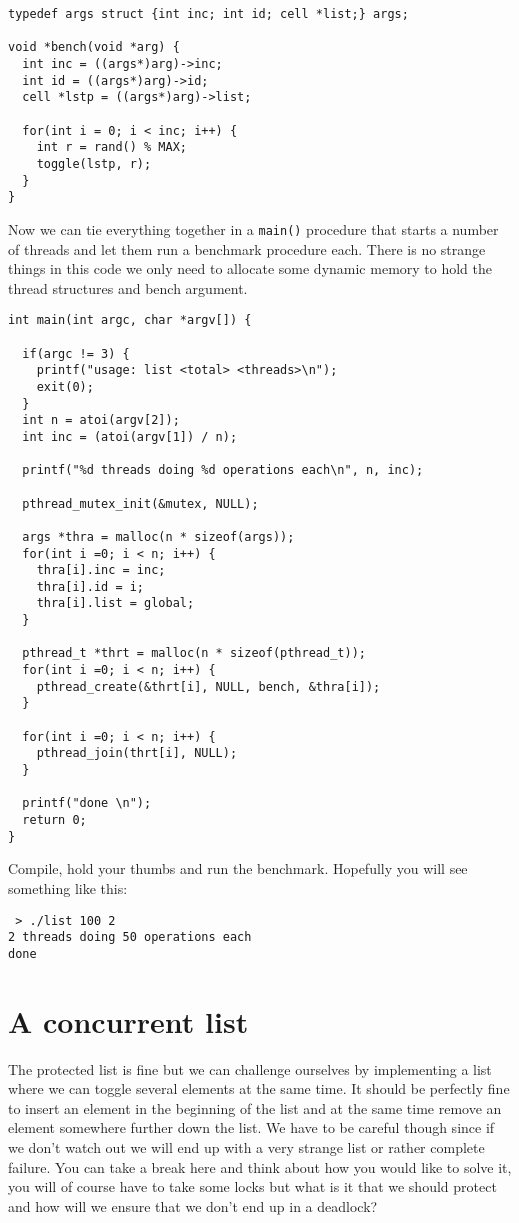 \documentclass[a4paper,11pt]{article}
\begin{document}
\begin{lstlisting}
typedef args struct {int inc; int id; cell *list;} args;

void *bench(void *arg) {
  int inc = ((args*)arg)->inc;
  int id = ((args*)arg)->id;
  cell *lstp = ((args*)arg)->list;  

  for(int i = 0; i < inc; i++) {
    int r = rand() % MAX;
    toggle(lstp, r);
  }
}
\end{lstlisting}

Now we can tie everything together in a {\tt main()} procedure that
starts a number of threads and let them run a benchmark procedure
each. There is no strange things in this code we only need to allocate
some dynamic memory to hold the thread structures and bench argument.

\begin{lstlisting}
int main(int argc, char *argv[]) {

  if(argc != 3) {
    printf("usage: list <total> <threads>\n");
    exit(0);
  }
  int n = atoi(argv[2]);  
  int inc = (atoi(argv[1]) / n);

  printf("%d threads doing %d operations each\n", n, inc);
  
  pthread_mutex_init(&mutex, NULL);

  args *thra = malloc(n * sizeof(args));
  for(int i =0; i < n; i++) {
    thra[i].inc = inc;
    thra[i].id = i;
    thra[i].list = global;
  }

  pthread_t *thrt = malloc(n * sizeof(pthread_t));  
  for(int i =0; i < n; i++) {
    pthread_create(&thrt[i], NULL, bench, &thra[i]);
  }

  for(int i =0; i < n; i++) {
    pthread_join(thrt[i], NULL);
  }  

  printf("done \n");
  return 0;
}
\end{lstlisting}

Compile, hold your thumbs and run the benchmark. Hopefully you will see something like this:

\begin{verbatim}
 > ./list 100 2
2 threads doing 50 operations each
done
\end{verbatim}

\section{A concurrent list}

The protected list is fine but we can challenge ourselves by
implementing a list where we can toggle several elements at the same
time. It should be perfectly fine to insert an element in the beginning
of the list and at the same time remove an element somewhere further
down the list. We have to be careful though since if we don't watch
out we will end up with a very strange list or rather complete
failure. You can take a break here and think about how you would like
to solve it, you will of course have to take some locks but what is it
that we should protect and how will we ensure that we don't end up in
a deadlock?
\end{document}
